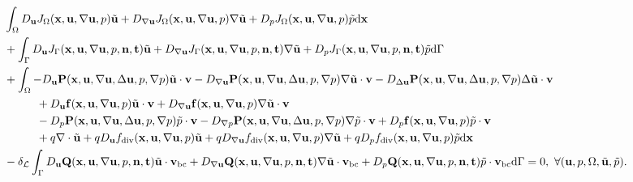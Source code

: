 \documentclass[oneside]{book}
\numberwithin{equation}{section}
\begin{document}
\begin{align*}
    &\int_\Omega D_{\bf u}J_\Omega({\bf x},{\bf u},\nabla{\bf u},p)\tilde{\bf u} + D_{\nabla{\bf u}}J_\Omega({\bf x},{\bf u},\nabla{\bf u},p)\nabla\tilde{\bf u} + D_pJ_\Omega({\bf x},{\bf u},\nabla{\bf u},p)\tilde{p}{\rm d}{\bf x}\\
    &+ \int_\Gamma D_{\bf u}J_\Gamma({\bf x},{\bf u},\nabla{\bf u},p,{\bf n},{\bf t})\tilde{\bf u} + D_{\nabla{\bf u}}J_\Gamma({\bf x},{\bf u},\nabla{\bf u},p,{\bf n},{\bf t})\nabla\tilde{\bf u} + D_pJ_\Gamma({\bf x},{\bf u},\nabla{\bf u},p,{\bf n},{\bf t})\tilde{p}{\rm d}\Gamma\\
    &+ \int_\Omega -D_{\bf u}{\bf P}({\bf x},{\bf u},\nabla{\bf u},\Delta{\bf u},p,\nabla p)\tilde{\bf u}\cdot{\bf v} - D_{\nabla{\bf u}}{\bf P}({\bf x},{\bf u},\nabla{\bf u},\Delta{\bf u},p,\nabla p)\nabla\tilde{\bf u}\cdot{\bf v} - D_{\Delta{\bf u}}{\bf P}({\bf x},{\bf u},\nabla{\bf u},\Delta{\bf u},p,\nabla p)\Delta\tilde{\bf u}\cdot{\bf v}\\
    &\hspace{1cm} + D_{\bf u}{\bf f}({\bf x},{\bf u},\nabla{\bf u},p)\tilde{\bf u}\cdot{\bf v} + D_{\nabla{\bf u}}{\bf f}({\bf x},{\bf u},\nabla{\bf u},p)\nabla\tilde{\bf u}\cdot{\bf v}\\
    &\hspace{1cm} - D_p{\bf P}({\bf x},{\bf u},\nabla{\bf u},\Delta{\bf u},p,\nabla p)\tilde{p}\cdot{\bf v} - D_{\nabla p}{\bf P}({\bf x},{\bf u},\nabla{\bf u},\Delta{\bf u},p,\nabla p)\nabla\tilde{p}\cdot{\bf v} + D_p{\bf f}({\bf x},{\bf u},\nabla{\bf u},p)\tilde{p}\cdot{\bf v}\\
    &\hspace{1cm} + q\nabla\cdot\tilde{\bf u} + qD_{\bf u}f_{\rm div}({\bf x},{\bf u},\nabla{\bf u},p)\tilde{\bf u} + qD_{\nabla{\bf u}}f_{\rm div}({\bf x},{\bf u},\nabla{\bf u},p)\nabla\tilde{\bf u} + qD_pf_{\rm div}({\bf x},{\bf u},\nabla{\bf u},p)\tilde{p}{\rm d}{\bf x}\\
    &- \delta_{\mathcal{L}}\int_\Gamma D_{\bf u}{\bf Q}({\bf x},{\bf u},\nabla{\bf u},p,{\bf n},{\bf t})\tilde{\bf u}\cdot{\bf v}_{\rm bc} + D_{\nabla{\bf u}}{\bf Q}({\bf x},{\bf u},\nabla{\bf u},p,{\bf n},{\bf t})\nabla\tilde{\bf u}\cdot{\bf v}_{\rm bc} + D_p{\bf Q}({\bf x},{\bf u},\nabla{\bf u},p,{\bf n},{\bf t})\tilde{p}\cdot{\bf v}_{\rm bc}{\rm d}\Gamma = 0,\ \forall({\bf u},p,\Omega,\tilde{\bf u},\tilde{p}).
\end{align*}
\end{document}
